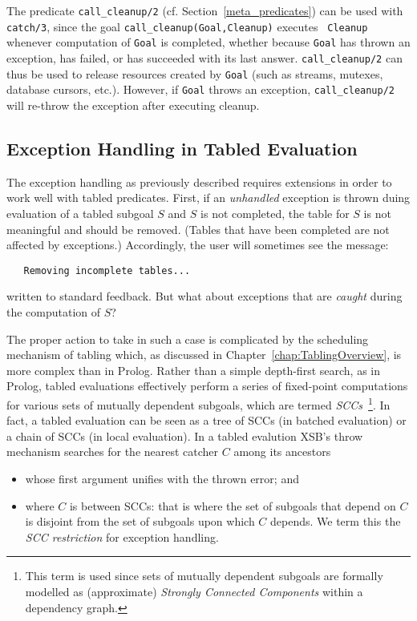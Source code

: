 The predicate {\tt call\_cleanup/2}
(cf. Section~\ref{meta_predicates}) can be used with {\tt catch/3},
since the goal {\tt call\_cleanup(Goal,Cleanup)} executes {\tt
  Cleanup} whenever computation of {\tt Goal} is completed, whether
because {\tt Goal} has thrown an exception, has failed, or has
succeeded with its last answer.  {\tt call\_cleanup/2} can thus be
used to release resources created by {\tt Goal} (such as streams,
mutexes, database cursors, etc.).  However, if {\tt Goal} throws an
exception, {\tt call\_cleanup/2} will re-throw the exception after
executing cleanup.

\subsection{Exception Handling in Tabled Evaluation} \label{sec:exceptions-w-tables}
%
The exception handling as previously described requires extensions in
order to work well with tabled predicates.  First, if an {\em
  unhandled} exception is thrown duing evaluation of a tabled subgoal
$S$ and $S$ is not completed, the table for $S$ is not meaningful and
should be removed.  (Tables that have been completed are not affected
by exceptions.)  Accordingly, the user will sometimes see the message:
%
\begin{verbatim}
   Removing incomplete tables...
\end{verbatim}
%
written to standard feedback.  But what about exceptions that are {\em
  caught} during the computation of $S$?

The proper action to take in such a case is complicated by the
scheduling mechanism of tabling which, as discussed in
Chapter~\ref{chap:TablingOverview}, is more complex than in Prolog.
Rather than a simple depth-first search, as in Prolog, tabled
evaluations effectively perform a series of fixed-point computations
for various sets of mutually dependent subgoals, which are termed {\em
  SCCs}~\footnote{This term is used since sets of mutually dependent
  subgoals are formally modelled as (approximate) {\em Strongly
    Connected Components} within a dependency graph.}.  In fact, a
tabled evaluation can be seen as a tree of SCCs (in batched
evaluation) or a chain of SCCs (in local evaluation).  In a tabled
evalution XSB's throw mechanism searches for the nearest catcher $C$
among its ancestors
%
\begin{itemize}
\item whose first argument unifies with the thrown error; and
\item where $C$ is between SCCs: that is where the set of subgoals
  that depend on $C$ is disjoint from the set of subgoals upon which
  $C$ depends.  We term this the {\em SCC restriction} for exception
  handling.
\end{itemize}
%


